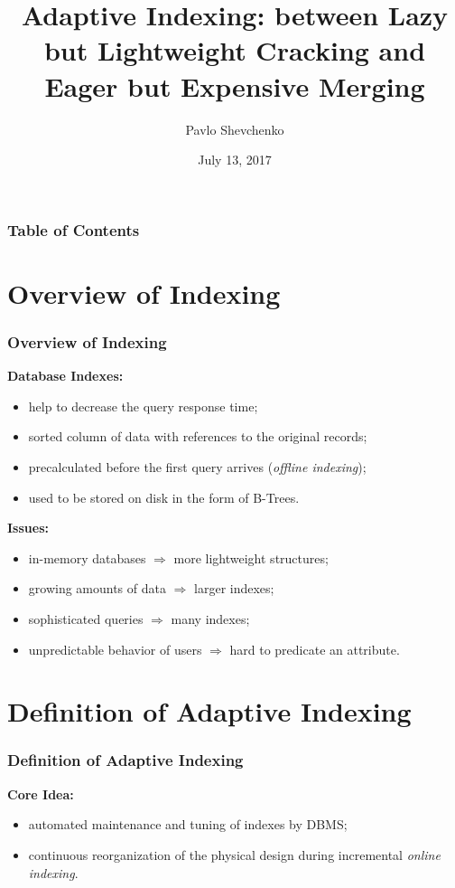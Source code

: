 \documentclass{beamer}
\title{Adaptive Indexing: between Lazy but Lightweight Cracking and Eager but Expensive Merging}
\author{Pavlo Shevchenko}
\date{July 13, 2017}
\institute{Seminar on Modern Software Engineering and Database Concepts}
\begin{document}
\begin{frame}[plain]
 \titlepage
\end{frame}

\begin{frame}
\frametitle{Table of Contents}
\tableofcontents
\end{frame}

\section{Overview of Indexing}
\begin{frame}
\frametitle{Overview of Indexing}
\textbf{Database Indexes:}
\begin{itemize}
\item{help to decrease the query response time;}
\item{sorted column of data with references to the original records;}
\item{precalculated before the first query arrives (\emph{offline indexing});}
\item{used to be stored on disk in the form of B-Trees.}
\end{itemize}
\pause
\textbf{Issues:}
\begin{itemize}
\item{in-memory databases $\Rightarrow$ more lightweight structures;}\pause
\item{growing amounts of data $\Rightarrow$ larger indexes;} \pause
\item{sophisticated queries $\Rightarrow$ many indexes;} \pause
\item{unpredictable behavior of users $\Rightarrow$ hard to predicate an attribute.}
\end{itemize}
\end{frame}

\section{Definition of Adaptive Indexing}
\begin{frame}
\frametitle{Definition of Adaptive Indexing}
\textbf{Core Idea:}
\begin{itemize}
\item{automated maintenance and tuning of indexes by DBMS;}
\item{continuous reorganization of the physical design during incremental \emph{online indexing}.}
\end{itemize}
\end{frame}
\end{document}
